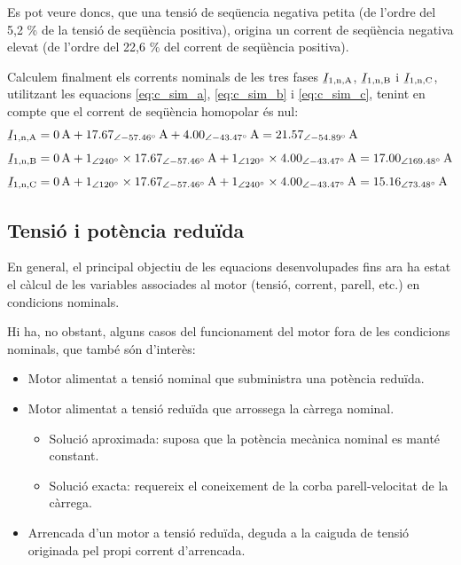 \begin{exemple}
	Es pot veure doncs, que una tensió de seqüencia negativa petita (de l'ordre del 5,2 \% de la tensió de seqüència positiva), origina un corrent de seqüència negativa elevat (de l'ordre del 22,6 \% del corrent de seqüència positiva). 
	
	Calculem finalment els corrents nominals de les tres fases $\cmplx{I}\ped{1,n,A}$, $\cmplx{I}\ped{1,n,B}$ i $\cmplx{I}\ped{1,n,C}$, utilitzant les equacions \eqref{eq:c_sim_a},
	\eqref{eq:c_sim_b} i \eqref{eq:c_sim_c}, tenint en compte que el corrent de seqüència homopolar és nul:
	\begin{align*}
		\cmplx{I}\ped{1,n,A} &= \SI{0}{A} + \SIpd{17,67}{-57,46}{A} +
		\SIpd{4,00}{-43,47}{A}  =
		\SIpd{21,57}{-54,89}{A} \\[1ex]
		\cmplx{I}\ped{1,n,B} &= \SI{0}{A} + \numpd{1}{240} \times
		\SIpd{17,67}{-57,46}{A} + \numpd{1}{120} \times
		\SIpd{4,00}{-43,47}{A}  =
		\SIpd{17,00}{169,48}{A}    \\[1ex]
		\cmplx{I}\ped{1,n,C} &= \SI{0}{A} + \numpd{1}{120} \times
		\SIpd{17,67}{-57,46}{A} +
		\numpd{1}{240} \times \SIpd{4,00}{-43,47}{A}  =
		\SIpd{15,16}{73,48}{A}
\end{align*}
	
\end{exemple}
	

\subsection{Tensió i potència reduïda}\label{sec:mot-tens-pot-red}

En general, el principal objectiu de les equacions desenvolupades fins ara ha estat  el càlcul de les variables associades al motor (tensió, corrent, parell, etc.) en condicions nominals.

Hi ha, no obstant, alguns casos del funcionament del motor fora de les condicions nominals, que també són d'interès: 
\begin{itemize}
	\item  Motor alimentat a tensió nominal que subministra una potència reduïda.
	\item  Motor alimentat a tensió reduïda que arrossega la càrrega nominal.
	\begin{itemize}
		\item Solució aproximada: suposa que la potència mecànica nominal es manté constant.
		\item Solució exacta: requereix el coneixement de la corba parell-velocitat de la càrrega.
	\end{itemize}	
	\item Arrencada d'un motor a tensió reduïda, deguda a la caiguda de tensió originada pel propi corrent d'arrencada.
\end{itemize}


